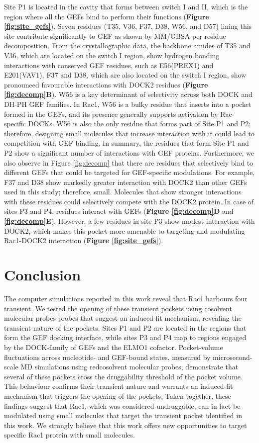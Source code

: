 \documentclass[12pt,a4paper]{achemso}
\begin{document}
Site P1 is located in the cavity that forms between switch I and II, which is the region where all the GEFs bind to perform their functions (\textbf{Figure \ref{fig:site_gefs}}). Seven residues (T35, V36, F37, D38, W56, and D57) lining this site contribute significantly to GEF as shown by MM/GBSA per residue decomposition. From the crystallographic data, the backbone amides of T35 and V36, which are located on the switch I region, show hydrogen bonding interactions with conserved GEF residues, such as E56(PREX1)\cite{prex1pdb} and E201(VAV1)\cite{vav1pdb}. F37 and D38, which are also located on the switch I region, show pronounced favourable interactions with DOCK2 residues (\textbf{Figure \ref{fig:decomp}B}). W56 is a key determinant of selectivity across both DOCK and DH-PH GEF families. In Rac1, W56 is a bulky residue that inserts into a pocket formed in the GEFs, and its presence generally supports activation by Rac-specific DOCKs. W56 is also the only residue that forms part of Site P1 and P2; therefore, designing small molecules that increase interaction with it could lead to competition with GEF binding. In summary, the residues that form Site P1 and P2 show a significant number of interactions with GEF proteins. Furthermore, we also observe in Figure \ref{fig:decomp} that there are residues that selectively bind to different GEFs that could be targeted for GEF-specific modulations. For example,  F37 and D38 show markedly greater interaction with DOCK2 than other GEFs used in this study; therefore, small. Molecules that show stronger interactions with these residues could selectively compete with the DOCK2 protein. In case of sites P3 and P4, residues interact with GEFs (\textbf{Figure \ref{fig:decomp}D} and \textbf{\ref{fig:decomp}E}). However, a few residues in site P3 show modest interaction with DOCK2, which makes this pocket more amenable to targeting and modulating Rac1-DOCK2 interaction (\textbf{Figure \ref{fig:site_gefs}}).

\section{Conclusion}
The computer simulations reported in this work reveal that Rac1 harbours four transient. We tested the opening of these transient pockets using cosolvent molecular probes probes that suggest an induced-fit mechanism, revealing the transient nature of the pockets. Sites P1 and P2 are located in the regions that form the GEF docking interface, while sites P3 and P4 map to regions engaged by the DOCK-family of GEFs and the ELMO1 cofactor. Pocket-volume fluctuations across nucleotide- and GEF-bound states, measured by microsecond-scale MD simulations using redcosolvent molecular probes, demonstrate that several of these pockets cross the druggability threshold of the pocket volume. This behaviour confirms their transient nature and warrants an induced-fit mechanism that triggers the opening of the pockets. Taken together, these findings suggest that Rac1, which was considered undruggable, can in fact be modulated using small molecules that target the transient pocket identified in this work. We strongly believe that this work offers new opportunities to target specific Rac1 protein with small molecules. 
\end{document}
